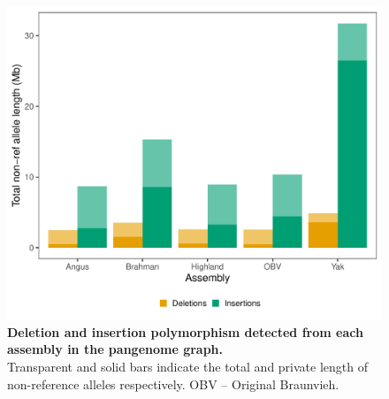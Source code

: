 \documentclass[../main.tex]{subfiles}
\begin{document}
\begin{flushleft}
\newpage


\begin{figure}[!htb]
    \centering
    \includegraphics[width=\textwidth]{paper3/supplement/sp45.pdf}
    \caption[Insertions and deletions across breeds]{\textbf{Deletion and insertion polymorphism detected from each assembly in the pangenome graph.} \\
    \small{Transparent and solid bars indicate the total and private length of non-reference alleles respectively. OBV – Original Braunvieh.}}
    \label{sup_fig:s45}
\end{figure}

\newpage


\end{flushleft}
\end{document}
